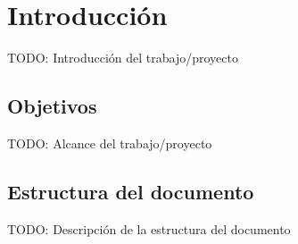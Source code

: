 \chapter{Introducción}

TODO: Introducción del trabajo/proyecto


\section{Objetivos}

TODO: Alcance del trabajo/proyecto

\section{Estructura del documento}

TODO: Descripción de la estructura del documento